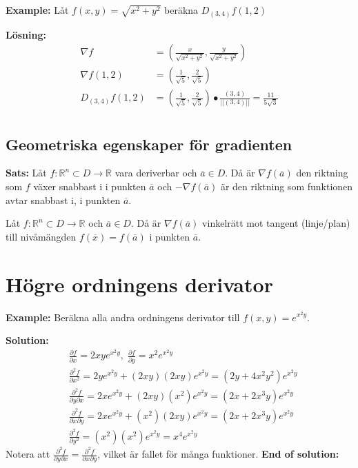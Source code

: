 \textbf{Example:}
Låt $f(x,y) = \sqrt{x^2+y^2}$ beräkna $D_{(3,4)}f(1,2)$

\textbf{Lösning:} 
\begin{align*}
    \nabla f &= \left( \frac{x}{\sqrt{x^2 + y^2}}, \frac{y}{\sqrt{x^2 + y^2}} \right) \\
    \nabla f(1,2) &= \left( \frac{1}{\sqrt{5}}, \frac{2}{\sqrt{5}} \right) \\
    D_{(3,4)}f(1,2) &= \left( \frac{1}{\sqrt{5}}, \frac{2}{\sqrt{5}} \right)\bullet\frac{(3,4)}{||(3,4)||} 
    = \frac{11}{5\sqrt{3}} \\
\end{align*}


\subsection{Geometriska egenskaper för gradienten}
\textbf{Sats:} 
Låt $f:\mathbb{R}^n\subset D\to\mathbb{R}$ vara deriverbar och 
$\overline{a}\in D$. Då är $\nabla f(\overline{a})$ den riktning
som $f$ växer snabbast i i punkten $\overline{a}$ och $-\nabla f(\overline{a})$
är den riktning som funktionen avtar snabbast i, i punkten $\overline{a}$.

Låt $f:\mathbb{R}^n\subset D\to\mathbb{R}$ och $\overline{a}\in D$.
Då är $\nabla f(\overline{a})$ vinkelrätt mot tangent (linje/plan)
till nivåmängden $f(\overline{x})=f(\overline{a})$ i punkten $\overline{a}$.


\section{Högre ordningens derivator}
\textbf{Example:} 
Beräkna alla andra ordningens derivator till 
$f(x,y) = e^{x^2y}$.

\textbf{Solution:} 
\begin{align*}
    &\frac{\partial f}{\partial x} = 2xye^{x^2y},\; \frac{\partial f}{\partial y} = x^2e^{x^2y} \\
    &\frac{\partial^2 f}{\partial x^2} = 2ye^{x^2y} + (2xy)(2xy)e^{x^2y} = (2y+4x^2y^2)e^{x^2y} \\
    &\frac{\partial^2 f}{\partial y\partial x} = 2xe^{x^2y} + (2xy)(x^2)e^{x^2y} = (2x+2x^3y)e^{x^2y} \\
    &\frac{\partial^2 f}{\partial x\partial y} = 2xe^{x^2y} + (x^2)(2xy)e^{x^2y} = (2x+2x^3y)e^{x^2y} \\
    &\frac{\partial^2 f}{\partial y^2} = (x^2)(x^2)e^{x^2y} = x^4e^{x^2y}
\end{align*}
Notera att $\frac{\partial^2 f}{\partial y\partial x} = \frac{\partial^2 f}{\partial x\partial y}$, vilket är fallet 
för många funktioner.
\textbf{End of solution:} 

